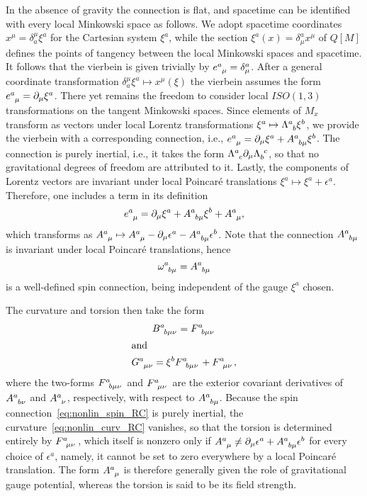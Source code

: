 \documentclass[%
5p,
times,
sort&compress
]{elsarticle}
\newcommand{\ind}{\indices}
\def\pd{\partial}
\begin{document}
In the absence of gravity the connection is flat, and spacetime 
can be identified with every local Minkowski space as follows. We 
adopt spacetime coordinates $x^\mu = \delta^\mu_a \xi^a$ for the 
Cartesian system $\xi^a$, while the section $\xi^a(x) 
= \delta^a_\mu x^\mu$ of $Q[M]$ defines the points of tangency 
between the local Minkowski spaces and spacetime. It follows that 
the vierbein is given trivially by $e\ind{^a_\mu} 
= \delta^a_\mu$. After a general coordinate transformation 
$\delta^\mu_a \xi^a \mapsto x^\mu(\xi)$ the vierbein assumes the 
form $e\ind{^a_\mu} = \pd_\mu \xi^a$. There yet remains the 
freedom to consider local $ISO(1,3)$ transformations on the 
tangent Minkowski spaces. Since elements of $M_x$ transform as 
vectors under local Lorentz transformations $\xi^a \mapsto 
\Lambda\ind{^a_b} \xi^b$, we provide the vierbein with 
a corresponding connection, i.e., $e\ind{^a_\mu} = \pd_\mu\xi^a 
+ A\ind{^a_{b\mu}}\xi^b$. The connection is purely inertial, 
i.e., it takes the form $\Lambda\ind{^a_c} \pd_\mu 
\Lambda\ind{_b^c}$, so that no gravitational degrees of freedom 
are attributed to it.  Lastly, the components of Lorentz vectors 
are invariant under local Poincar\'e translations $\xi^a \mapsto 
\xi^a + \epsilon^a$.  Therefore, one includes a term in its 
definition
\begin{equation}
\label{eq:nonlin_vier_RC}
  e\ind{^a_\mu} = \pd_\mu\xi^a + A\ind{^a_{b\mu}}\xi^b 
  + A\ind{^a_\mu},
\end{equation}
which transforms as $A\ind{^a_\mu} \mapsto A\ind{^a_\mu} 
- \pd_\mu \epsilon^a - A\ind{^a_{b\mu}} \epsilon^b$. Note that 
the connection $A\ind{^a_{b\mu}}$ is invariant under local 
Poincar\'e translations, hence
\begin{equation}
\label{eq:nonlin_spin_RC}
  \omega\ind{^a_{b\mu}} = A\ind{^a_{b\mu}}
\end{equation}
is a well-defined spin connection, being independent of the gauge 
$\xi^a$ chosen.

The curvature and torsion then take the form
\begin{gather}
\label{eq:nonlin_curv_RC}
  B\ind{^a_{b\mu\nu}} = F\ind{^a_{b\mu\nu}}
  \\
  \shortintertext{and}
  \label{eq:nonlin_tors_RC}
  G\ind{^a_{\mu\nu}} = \xi^b F\ind{^a_{b\mu\nu}} 
  + F\ind{^a_{\mu\nu}},
\end{gather}
where the two-forms $F\ind{^a_{b\mu\nu}}$ and 
$F\ind{^a_{\mu\nu}}$ are the exterior covariant derivatives of 
$A\ind{^a_{b\nu}}$ and $A\ind{^a_\nu}$, respectively, with 
respect to $A\ind{^a_{b\mu}}$. Because the spin 
connection~\eqref{eq:nonlin_spin_RC} is purely inertial, the 
curvature~\eqref{eq:nonlin_curv_RC} vanishes, so that the torsion 
is determined entirely by $F\ind{^a_{\mu\nu}}$, which itself is 
nonzero only if $A\ind{^a_\mu} \neq \pd_\mu \epsilon^a 
+ A\ind{^a_{b\mu}} \epsilon^b$ for every choice of $\epsilon^a$, 
namely, it cannot be set to zero everywhere by a local Poincar\'e 
translation. The form $A\ind{^a_\mu}$ is therefore generally 
given the role of gravitational gauge potential, whereas the 
torsion is said to be its field strength.
\end{document}
